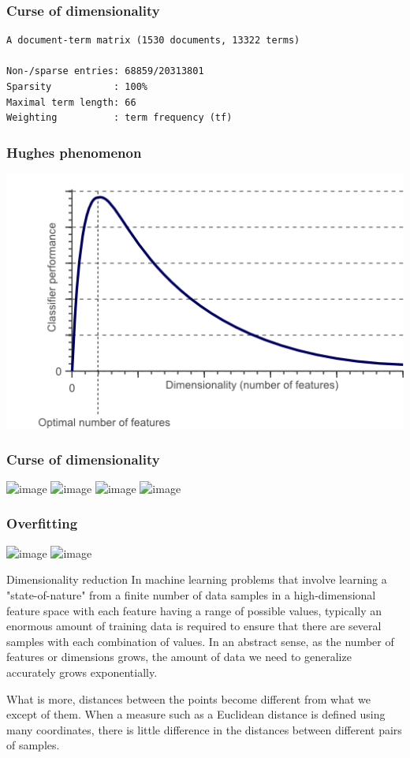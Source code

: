 \documentclass[svgnames]{beamer}
\begin{document}
\begin{frame}[fragile]
  \frametitle{Curse of dimensionality}
\begin{verbatim}
A document-term matrix (1530 documents, 13322 terms)

Non-/sparse entries: 68859/20313801
Sparsity           : 100%
Maximal term length: 66 
Weighting          : term frequency (tf)
\end{verbatim}
\end{frame}

\begin{frame}
  \frametitle{Hughes phenomenon}
  \centering
  \includegraphics[width=.9\textwidth]{dimensionality_vs_performance}
\end{frame}

\begin{frame}
  \frametitle{Curse of dimensionality}
  \centering
  \includegraphics<1>[width=.6\textwidth]{1Dproblem}
  \includegraphics<2>[width=.6\textwidth]{2Dproblem}
  \includegraphics<3>[width=.6\textwidth]{3Dproblem}
  \includegraphics<4>[width=.6\textwidth]{3Dproblem_separated}
\end{frame}

\begin{frame}
  \frametitle{Overfitting}
  \centering
  \includegraphics<1>[width=.6\textwidth]{overfitting}  
  \includegraphics<2>[width=.6\textwidth]{no_overfitting}  
\end{frame}



\begin{frame}{Dimensionality reduction}
  In machine learning problems that involve learning a "state-of-nature" from a finite number of data samples in a high-dimensional feature space with each feature having a range of possible values,
  typically an enormous amount of training data is required to ensure that there are several samples with each combination of values.
  In an abstract sense, as the number of features or dimensions grows, the amount of data we need to generalize accurately grows exponentially.


  What is more, distances between the points become different from what we except of them. When a measure such as a Euclidean distance is defined using many coordinates, there is little difference in the distances between different pairs of samples.
\end{frame}
\end{document}
